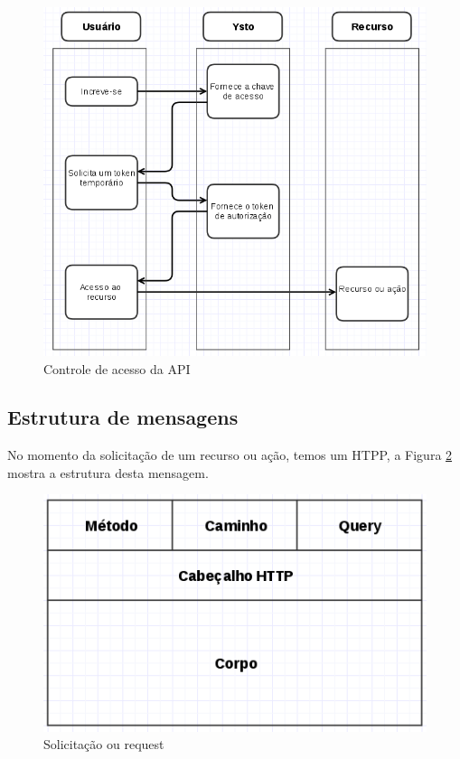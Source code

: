 \begin{figure}[H]
\caption{\label{controle-acesso} Controle de acesso da API}
\includegraphics[scale=0.5]{img/auth-recursos.png}
\end{figure}

\subsection{Estrutura de mensagens}
No momento da solicitação de um recurso ou ação, temos um HTPP, a Figura \ref{request} mostra a estrutura desta mensagem.

\begin{figure}[H]
\caption{\label{request} Solicitação ou request}
\includegraphics[scale=0.5]{img/api-request.png}
\end{figure}

